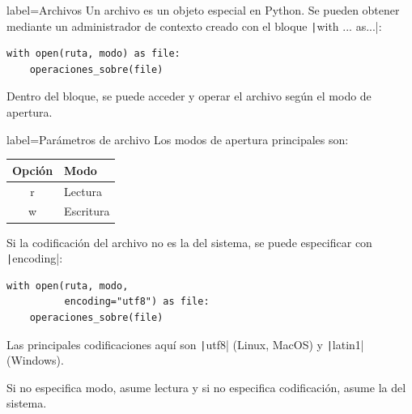 
    
    
    

\begin{contentbox}{label=Archivos}
    Un archivo es un objeto especial en Python. Se pueden obtener mediante un administrador de contexto creado con el bloque \texttt|with ... as...|:

    \begin{verbatim}
with open(ruta, modo) as file:
    operaciones_sobre(file)
    \end{verbatim}

    Dentro del bloque, se puede acceder y operar el archivo según el modo de apertura.
\end{contentbox}

\begin{contentbox}{label=Parámetros de archivo}
    Los modos de apertura principales son:
    
    \begin{center}
        \begin{tabular}{C|p{0.5\textwidth}}
            \textnormal{Opción} & Modo \\
            \hline
            r & Lectura \\
            w & Escritura
        \end{tabular}
    \end{center}
    
    Si la codificación del archivo no es la del sistema, se puede especificar con \texttt|encoding|:
    \begin{verbatim}
with open(ruta, modo,
          encoding="utf8") as file:
    operaciones_sobre(file)
    \end{verbatim}
    
    Las principales codificaciones aquí son \texttt|utf8| (Linux, MacOS) y \texttt|latin1| (Windows).

    Si no especifica modo, asume lectura y si no especifica codificación, asume la del sistema.
\end{contentbox}
    
